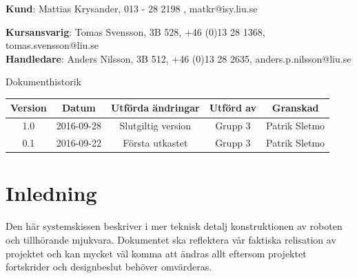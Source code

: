 \documentclass{article}
\begin{document}
\begin{center}
\textbf{Kund}: Mattias Krysander, 013 - 28 2198 , matkr@isy.liu.se
\end{center}

\begin{center}
\textbf{Kursansvarig}: Tomas Svensson, 3B 528, +46 (0)13 28 1368, tomas.svensson@liu.se \\
\textbf{Handledare}: Anders Nilsson, 3B 512, +46 (0)13 28 2635, anders.p.nilsson@liu.se
\end{center}
\vspace*{\fill}
\clearpage

\renewcommand*\contentsname{Innehållsförteckning}
\tableofcontents
\clearpage


{
\sffamily
\centering
\large


{\huge 
Dokumenthistorik \\
}
\begin{center}
\begin{tabular}{ | c | c | c | c | c |} 
\hline
\textbf{Version} & \textbf{Datum} & \textbf{Utförda ändringar} & \textbf{Utförd av } & \textbf{Granskad} \\  
\hline
1.0 & 2016-09-28 & Slutgiltig version & Grupp 3 & Patrik Sletmo \\
\hline
0.1 & 2016-09-22 & Första utkastet & Grupp 3 & Patrik Sletmo \\
\hline
\end{tabular}
\end{center}
}

\clearpage


\section{Inledning}
Den här systemskissen beskriver i mer teknisk detalj konstruktionen av roboten och tillhörande mjukvara. Dokumentet ska reflektera vår faktiska relisation av projektet och kan mycket väl komma att ändras allt eftersom projektet fortskrider och designbeslut behöver omvärderas.
\end{document}
